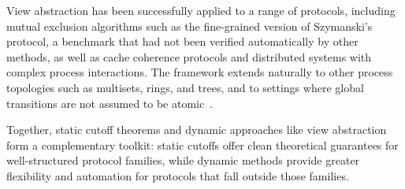 View abstraction has been successfully applied to a range of protocols,
including mutual exclusion algorithms such as the fine-grained version of
Szymanski's protocol, a benchmark that had not been verified automatically
by other methods, as well as cache coherence protocols and distributed
systems with complex process interactions. The framework extends naturally to
other process topologies such as multisets, rings, and trees, and to settings
where global transitions are not assumed to be atomic~\cite{AHH13}.

Together, static cutoff theorems and dynamic approaches like view abstraction
form a complementary toolkit: static cutoffs offer clean theoretical
guarantees for well-structured protocol families, while dynamic methods
provide greater flexibility and automation for protocols that fall outside
those families.

